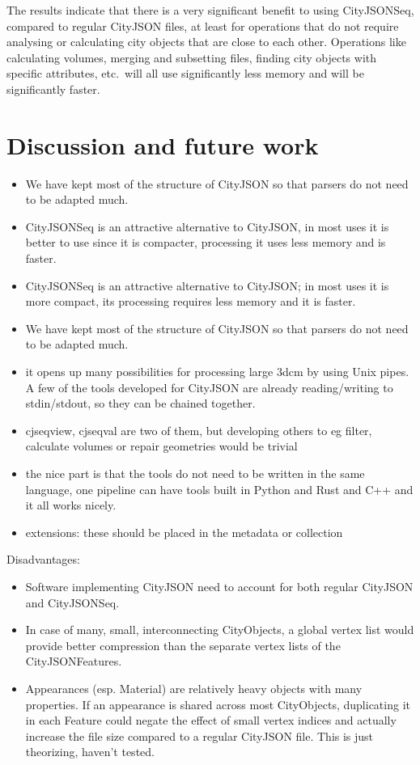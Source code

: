 \documentclass{isprs} %
\begin{document}
The results indicate that there is a very significant benefit to using CityJSONSeq, compared to regular CityJSON files, at least for operations that do not require analysing or calculating city objects that are close to each other.
Operations like calculating volumes, merging and subsetting files, finding city objects with specific attributes, etc.\ will all use significantly less memory and will be significantly faster.


%
\section{Discussion and future work}%
\label{sec:discussion}

\begin{itemize}
  \item We have kept most of the structure of CityJSON so that parsers do not need to be adapted much.
  \item CityJSONSeq is an attractive alternative to CityJSON, in most uses it is better to use since it is compacter, processing it uses less memory and is faster.
  \item CityJSONSeq is an attractive alternative to CityJSON; in most uses it is more compact, its processing requires less memory and it is faster.
  \item We have kept most of the structure of CityJSON so that parsers do not need to be adapted much.
  \item it opens up many possibilities for processing large 3dcm by using Unix pipes. A few of the tools developed for CityJSON are already reading/writing to stdin/stdout, so they can be chained together.
  \item cjseqview, cjseqval are two of them, but developing others to eg filter, calculate volumes or repair geometries would be trivial
  \item the nice part is that the tools do not need to be written in the same language, one pipeline can have tools built in Python and Rust and C++ and it all works nicely.
  \item extensions: these should be placed in the metadata or collection
\end{itemize}

Disadvantages:
\begin{itemize}
  \item  Software implementing CityJSON need to account for both regular CityJSON and CityJSONSeq.
  \item  In case of many, small, interconnecting CityObjects, a global vertex list would provide better compression than the separate vertex lists of the CityJSONFeatures.
  \item  Appearances (esp. Material) are relatively heavy objects with many properties. If an appearance is shared across most CityObjects, duplicating it in each Feature could negate the effect of small vertex indices and actually increase the file size compared to a regular CityJSON file. This is just theorizing, haven't tested.
\end{itemize}


{
	\begin{spacing}{1.17}
		\normalsize
	\end{spacing}
}
\end{document}
